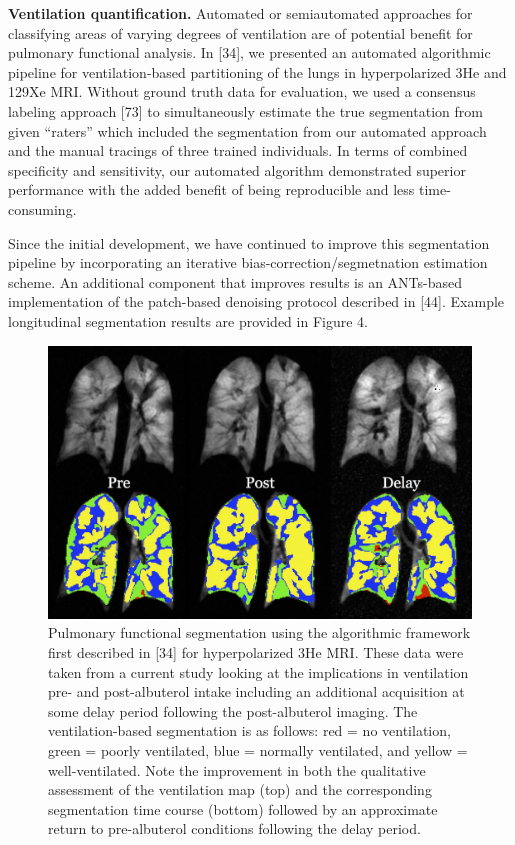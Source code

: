 \documentclass[11pt,]{article}
\begin{document}
\textbf{Ventilation quantification.} Automated or semiautomated
approaches for classifying areas of varying degrees of ventilation are
of potential benefit for pulmonary functional analysis. In {[}34{]}, we
presented an automated algorithmic pipeline for ventilation-based
partitioning of the lungs in hyperpolarized 3He and 129Xe MRI. Without
ground truth data for evaluation, we used a consensus labeling approach
{[}73{]} to simultaneously estimate the true segmentation from given
``raters'' which included the segmentation from our automated approach
and the manual tracings of three trained individuals. In terms of
combined specificity and sensitivity, our automated algorithm
demonstrated superior performance with the added benefit of being
reproducible and less time-consuming.

Since the initial development, we have continued to improve this
segmentation pipeline by incorporating an iterative
bias-correction/segmetnation estimation scheme. An additional component
that improves results is an ANTs-based implementation of the patch-based
denoising protocol described in {[}44{]}. Example longitudinal
segmentation results are provided in Figure 4.

\begin{figure}[htbp]
\centering
\includegraphics{Figs/prePostAlbuterol.png}
\caption{Pulmonary functional segmentation using the algorithmic
framework first described in {[}34{]} for hyperpolarized 3He MRI. These
data were taken from a current study looking at the implications in
ventilation pre- and post-albuterol intake including an additional
acquisition at some delay period following the post-albuterol imaging.
The ventilation-based segmentation is as follows: red = no ventilation,
green = poorly ventilated, blue = normally ventilated, and yellow =
well-ventilated. Note the improvement in both the qualitative assessment
of the ventilation map (top) and the corresponding segmentation time
course (bottom) followed by an approximate return to pre-albuterol
conditions following the delay period.}
\end{figure}
\end{document}
